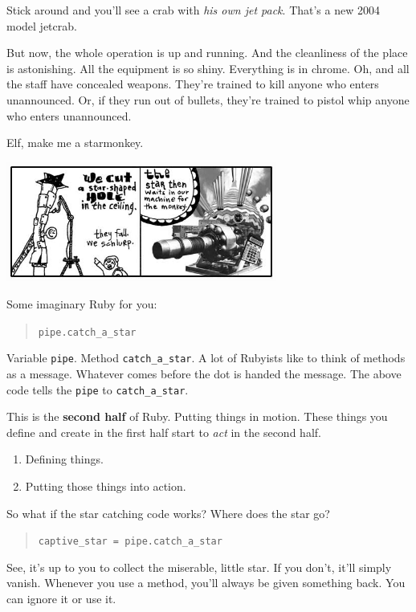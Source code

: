 \documentclass[10pt,twoside]{report}
\begin{document}
Stick around and you'll see a crab with {\em his own jet pack}.
That's a new 2004 model jetcrab.

But now, the whole operation is up and running.  And the cleanliness
of the place is astonishing. All the equipment is so shiny.
Everything is in chrome.  Oh, and all the staff have concealed
weapons.  They're trained to kill anyone who enters unannounced.  Or,
if they run out of bullets, they're trained to pistol whip anyone who
enters unannounced.

Elf, make me a starmonkey.

	\includegraphics[width=0.66625\textwidth]{cache/24.png}

Some imaginary Ruby for you:

\begin{quote}
\lstinline[breaklines=true]|pipe.catch_a_star|\end{quote}


Variable \lstinline[breaklines=true]|pipe|.  Method
\lstinline[breaklines=true]|catch_a_star|.  A lot of Rubyists like to
think of methods as a message. Whatever comes before the dot is handed
the message.  The above code tells the
\lstinline[breaklines=true]|pipe| to
\lstinline[breaklines=true]|catch_a_star|.

This is the {\bf second half} of Ruby.  Putting things in motion.
These things you define and create in the first half start to {\em
  act} in the second half.

\begin{enumerate}
\item Defining things.
\item Putting those things into action.
\end{enumerate}

So what if the star catching code works?  Where does the star go?

\begin{quote}
\lstinline[breaklines=true]|captive_star = pipe.catch_a_star|\end{quote}


See, it's up to you to collect the miserable, little star.  If you
don't, it'll simply vanish. Whenever you use a method, you'll always
be given something back.  You can ignore it or use it.
\end{document}
